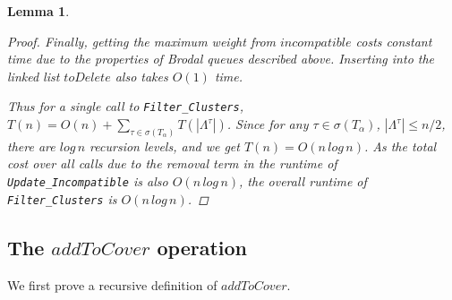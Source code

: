\documentclass{article}
\newcommand{\leafset}{\Lambda}
\newcommand{\TA}{T_\alpha}
\newtheorem{filterclustersruntime}[incompatibility]{Lemma}
\begin{document}
\begin{filterclustersruntime}
\begin{proof}
            Finally, getting the maximum weight from $incompatible$ costs constant time due to the properties of Brodal queues described above. Inserting into the linked list $toDelete$ also takes $O(1)$ time.

            Thus for a single call to \texttt{Filter\_Clusters}, $T(n) = O(n) + \sum_{\tau \in \sigma(\TA)} T(|\leafset^{\tau}|)$. Since for any $\tau \in \sigma(\TA)$, $|\leafset^{\tau}| \leq n/2$, there are $log\,n$ recursion levels, and we get $T(n) = O(n\,log\,n)$. As the total cost over all calls due to the removal term in the runtime of \texttt{Update\_Incompatible} is also $O(n\,log\,n)$, the overall runtime of \texttt{Filter\_Clusters} is $O(n\,log\,n)$.
        \end{proof}
    \end{filterclustersruntime}

    \subsection{The $addToCover$ operation}
    \label{subsec:addtocover}

    We first prove a recursive definition of $addToCover$.
    \newline
\end{document}
